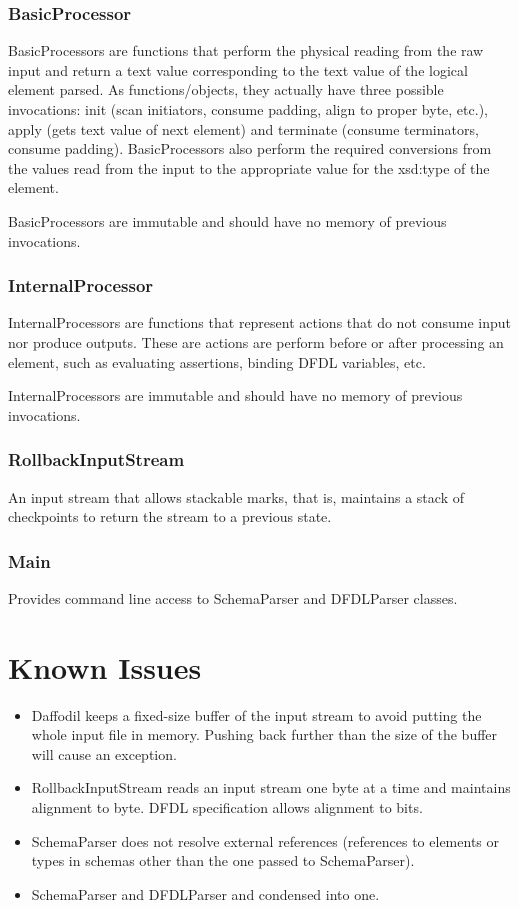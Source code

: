 \documentclass[a4paper,10pt]{article}
\begin{document}
\subsubsection{BasicProcessor}

BasicProcessors are functions that perform the physical reading from the raw input and return a text value corresponding to the text value of the logical element parsed. As functions/objects, they actually have three possible invocations: init (scan initiators, consume padding, align to proper byte, etc.), apply (gets text value of next element) and terminate (consume terminators, consume padding). BasicProcessors also perform the required conversions from the values read from the input to the appropriate value for the xsd:type of the element.

BasicProcessors are immutable and should have no memory of previous invocations.

\subsubsection{InternalProcessor}

InternalProcessors are functions that represent actions that do not consume input nor produce outputs. These are actions are perform before or after processing an element, such as evaluating assertions, binding DFDL variables, etc.

InternalProcessors are immutable and should have no memory of previous invocations.

\subsubsection{RollbackInputStream}

An input stream that allows stackable marks, that is, maintains a stack of checkpoints to return the stream to a previous state.

\subsubsection{Main}

Provides command line access to SchemaParser and DFDLParser classes.

\section{Known Issues}

\begin{itemize}
 \item Daffodil keeps a fixed-size buffer of the input stream to avoid putting the whole input file in memory. Pushing back further than the size of the buffer will cause an exception.
 \item RollbackInputStream reads an input stream one byte at a time and maintains alignment to byte. DFDL specification allows alignment to bits.
 \item SchemaParser does not resolve external references (references to elements or types in schemas other than the one passed to SchemaParser).
 \item SchemaParser and DFDLParser and condensed into one.
\end{itemize}
\end{document}
